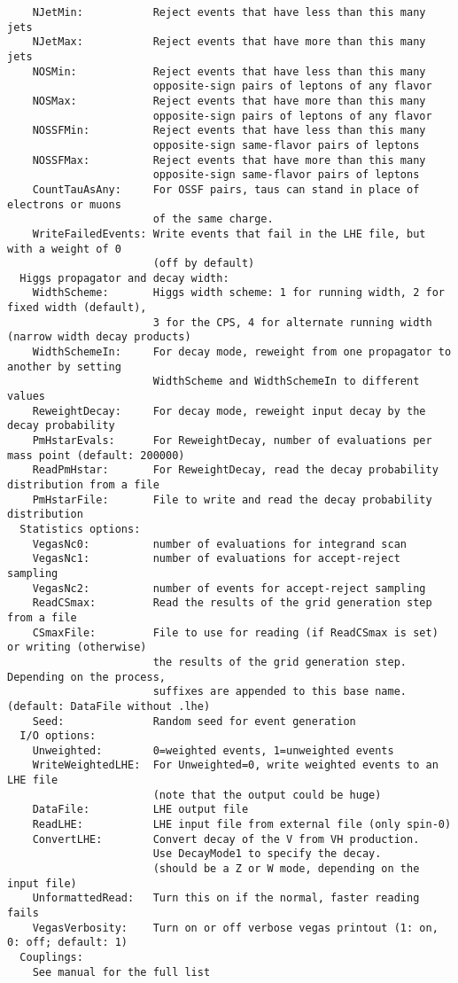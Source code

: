 \documentclass[aps,superscriptaddress,nofootinbib]{revtex4}
\begin{document}
\begin{verbatim}
    NJetMin:           Reject events that have less than this many jets
    NJetMax:           Reject events that have more than this many jets
    NOSMin:            Reject events that have less than this many
                       opposite-sign pairs of leptons of any flavor
    NOSMax:            Reject events that have more than this many
                       opposite-sign pairs of leptons of any flavor
    NOSSFMin:          Reject events that have less than this many
                       opposite-sign same-flavor pairs of leptons
    NOSSFMax:          Reject events that have more than this many
                       opposite-sign same-flavor pairs of leptons
    CountTauAsAny:     For OSSF pairs, taus can stand in place of electrons or muons
                       of the same charge.
    WriteFailedEvents: Write events that fail in the LHE file, but with a weight of 0
                       (off by default)
  Higgs propagator and decay width:
    WidthScheme:       Higgs width scheme: 1 for running width, 2 for fixed width (default),
                       3 for the CPS, 4 for alternate running width (narrow width decay products)
    WidthSchemeIn:     For decay mode, reweight from one propagator to another by setting
                       WidthScheme and WidthSchemeIn to different values
    ReweightDecay:     For decay mode, reweight input decay by the decay probability
    PmHstarEvals:      For ReweightDecay, number of evaluations per mass point (default: 200000)
    ReadPmHstar:       For ReweightDecay, read the decay probability distribution from a file
    PmHstarFile:       File to write and read the decay probability distribution
  Statistics options:
    VegasNc0:          number of evaluations for integrand scan
    VegasNc1:          number of evaluations for accept-reject sampling
    VegasNc2:          number of events for accept-reject sampling
    ReadCSmax:         Read the results of the grid generation step from a file
    CSmaxFile:         File to use for reading (if ReadCSmax is set) or writing (otherwise)
                       the results of the grid generation step.  Depending on the process,
                       suffixes are appended to this base name. (default: DataFile without .lhe)
    Seed:              Random seed for event generation
  I/O options:
    Unweighted:        0=weighted events, 1=unweighted events
    WriteWeightedLHE:  For Unweighted=0, write weighted events to an LHE file
                       (note that the output could be huge)
    DataFile:          LHE output file
    ReadLHE:           LHE input file from external file (only spin-0)
    ConvertLHE:        Convert decay of the V from VH production.
                       Use DecayMode1 to specify the decay.
                       (should be a Z or W mode, depending on the input file)
    UnformattedRead:   Turn this on if the normal, faster reading fails
    VegasVerbosity:    Turn on or off verbose vegas printout (1: on, 0: off; default: 1)
  Couplings:
    See manual for the full list
\end{verbatim}
\end{document}
